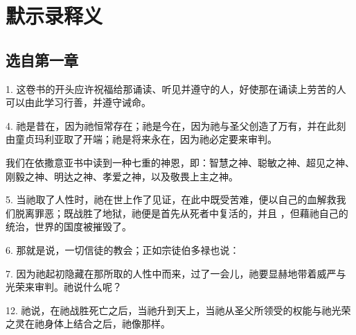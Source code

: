 
\chapter{默示录释义}



\section{选自第一章}

1.  这卷书的开头应许祝福给那诵读、听见并遵守的人，好使那在诵读上劳苦的人可以由此学习行善，并遵守诫命。\par

4.  祂是昔在，因为祂恒常存在；祂是今在，因为祂与圣父创造了万有，并在此刻由童贞玛利亚取了开端；祂是将来永在，因为祂必定要来审判。\par

 我们在依撒意亚书中读到一种七重的神恩，即：智慧之神、聪敏之神、超见之神、刚毅之神、明达之神、孝爱之神，以及敬畏上主之神。\par

5.  当祂取了人性时，祂在世上作了见证，在此中既受苦难，便以自己的血解救我们脱离罪恶；既战胜了地狱，祂便是首先从死者中复活的，并且  ，但藉祂自己的统治，世界的国度被摧毁了。\par

6.  那就是说，一切信徒的教会；正如宗徒伯多禄也说： \par

7.  因为祂起初隐藏在那所取的人性中而来，过了一会儿，祂要显赫地带着威严与光荣来审判。祂说什么呢？\par

12.  祂说，在祂战胜死亡之后，当祂升到天上，当祂从圣父所领受的权能与祂光荣之灵在祂身体上结合之后，祂像那样。\par

